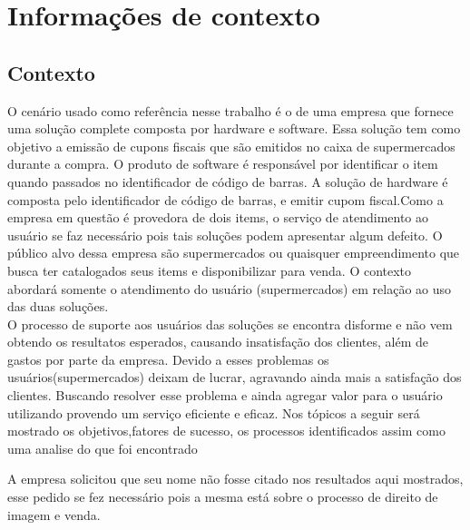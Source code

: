 \section{Informações de contexto}

\subsection{Contexto}
	O cenário usado como referência nesse trabalho é o de uma empresa que
	fornece uma solução complete composta por  hardware e software.
	Essa solução tem como objetivo a emissão de cupons fiscais que são emitidos no
	caixa de supermercados durante a compra.
	O produto de software é responsável por identificar o item quando passados no
	identificador de código de barras. A solução de hardware é composta pelo identificador
	de código de barras, e emitir cupom fiscal.Como a empresa em questão é
	provedora de dois items, o serviço de atendimento ao
	usuário se faz necessário pois tais soluções podem apresentar algum defeito.
	O público alvo dessa empresa são supermercados ou quaisquer empreendimento
	que busca ter catalogados seus items e disponibilizar para venda. O contexto
	abordará somente o atendimento do usuário (supermercados) em relação ao uso das duas soluções.\\
	O processo de suporte aos usuários das soluções se encontra disforme e não vem obtendo
	os resultatos esperados, causando insatisfação dos clientes, além de gastos por parte da empresa.
	Devido a esses problemas os usuários(supermercados) deixam de lucrar, agravando ainda mais a satisfação
	dos clientes. Buscando resolver esse problema e ainda agregar valor para o usuário utilizando provendo
	um serviço eficiente e eficaz.
	Nos tópicos a seguir será mostrado os objetivos,fatores de sucesso, os processos
	identificados assim como uma analise do que foi encontrado

		A empresa solicitou que seu nome não fosse citado nos resultados aqui mostrados, esse pedido
	se fez necessário pois a mesma está sobre o processo de direito de imagem e venda.

